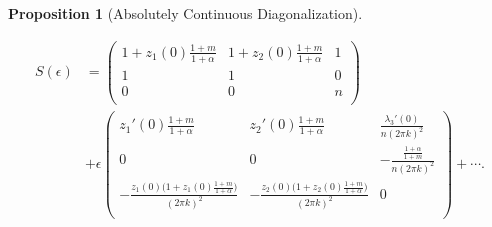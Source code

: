 \documentclass[a4paper,11pt]{article}
\newtheorem{proposition}{Proposition}[section]
\theoremstyle{remark}
\begin{document}
\begin{proposition}[Absolutely Continuous Diagonalization]
\begin{enumerate}
\begin{align}
   S(\epsilon) &=
   \begin{pmatrix}
    1 + z_1(0)\frac{1+m}{1+\alpha} & 1 + z_2(0)\frac{1+m}{1+\alpha} & 1\\
    1 & 1 & 0\\
    0 & 0 & n\\
   \end{pmatrix} \\&+ \epsilon
   \begin{pmatrix}
    z_1'(0)\frac{1+m}{1+\alpha} & z_2'(0)\frac{1+m}{1+\alpha} & \frac{\lambda_3'(0)}{n(2\pi k)^2}\\
    0 & 0 & -\frac{\frac{1+\alpha}{1+m}}{n(2\pi k)^2}\\
    -\frac{z_1(0)\big(1+z_1(0)\frac{1+m}{1+\alpha}\big)}{(2\pi k)^2} & -\frac{z_2(0)\big(1+z_2(0)\frac{1+m}{1+\alpha}\big)}{(2\pi k)^2} & 0\\
   \end{pmatrix} + \cdots. \label{eq:S}
  \end{align}
 \end{enumerate}
\end{proposition}
\end{document}
